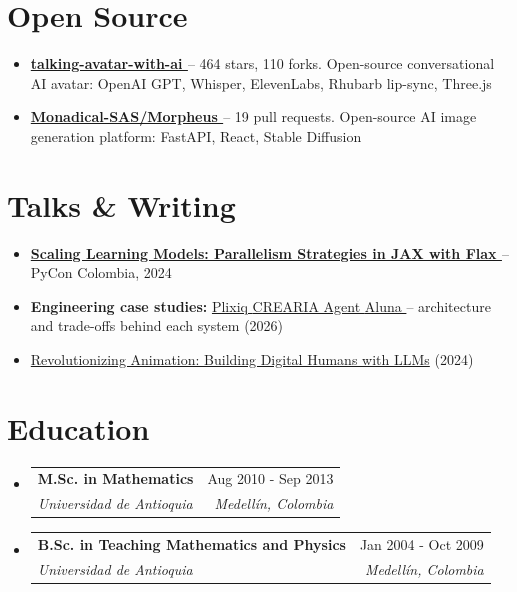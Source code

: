 \documentclass[letterpaper,10pt]{article}
\makeatletter
\newcommand{\resumeSubheading}[4]{
  \vspace{-2pt}
  \item[]
  \begin{tabular*}{\textwidth}{@{\extracolsep{\fill}}l r}
    \textbf{#1} & #2 \\
    \textit{#3} & \textit{#4} \\
  \end{tabular*}
  \vspace{-5pt}
}
\newcommand{\normalfaExternalLink}{{\mdseries\faExternalLink}}
\newcommand{\normalfaYoutube}{{\mdseries\faYoutube}}
\makeatother
\begin{document}
\section{Open Source}
\begin{itemize}[leftmargin=*, itemsep=0pt]
    \item \textbf{\href{https://github.com/asanchezyali/talking-avatar-with-ai}{talking-avatar-with-ai \normalfaExternalLink}} -- 464 stars, 110 forks. Open-source conversational AI avatar: OpenAI GPT, Whisper, ElevenLabs, Rhubarb lip-sync, Three.js
    \item \textbf{\href{https://github.com/Monadical-SAS/Morpheus}{Monadical-SAS/Morpheus \normalfaExternalLink}} -- 19 pull requests. Open-source AI image generation platform: FastAPI, React, Stable Diffusion
\end{itemize}

\section{Talks \& Writing}
\begin{itemize}[leftmargin=*, itemsep=0pt]
    \item \textbf{\href{https://www.youtube.com/watch?v=m4hP1soE414}{Scaling Learning Models: Parallelism Strategies in JAX with Flax \normalfaYoutube}} -- PyCon Colombia, 2024
    \item \textbf{Engineering case studies:} \href{https://www.asanchezyali.com/blog/case-studies/plixiq}{Plixiq \normalfaExternalLink} \textperiodcentered{} \href{https://www.asanchezyali.com/blog/case-studies/crearia-agent}{CREARIA Agent \normalfaExternalLink} \textperiodcentered{} \href{https://www.asanchezyali.com/blog/case-studies/aluna}{Aluna \normalfaExternalLink} -- architecture and trade-offs behind each system (2026)
    \item \href{https://monadical.com/posts/build-a-digital-human-with-large-language-models.html}{Revolutionizing Animation: Building Digital Humans with LLMs} (2024)
\end{itemize}

\section{Education}
\begin{itemize}[leftmargin=0pt, itemindent=0pt, label={}]
\resumeSubheading
{M.Sc. in Mathematics}{Aug 2010 - Sep 2013}
{Universidad de Antioquia}{Medell\'in, Colombia}
\resumeSubheading
{B.Sc. in Teaching Mathematics and Physics}{Jan 2004 - Oct 2009}
{Universidad de Antioquia}{Medell\'in, Colombia}
\end{itemize}
\end{document}

